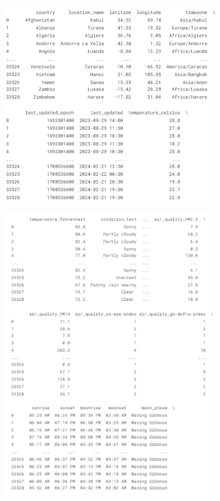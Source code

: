 \documentclass[12pt]{article}
\begin{document}
\begin{figure}[h]
    \centering
    \begin{subfigure}{0.48\textwidth}
      \centering
      \includegraphics[width=\linewidth]{WWR.png}
      \label{fig:sub1}
    \end{subfigure}
    \hfill
    \begin{subfigure}{0.48\textwidth}
      \centering
      \includegraphics[width=\linewidth]{WWR2.png}

\end{subfigure}
\end{figure}
\end{document}
